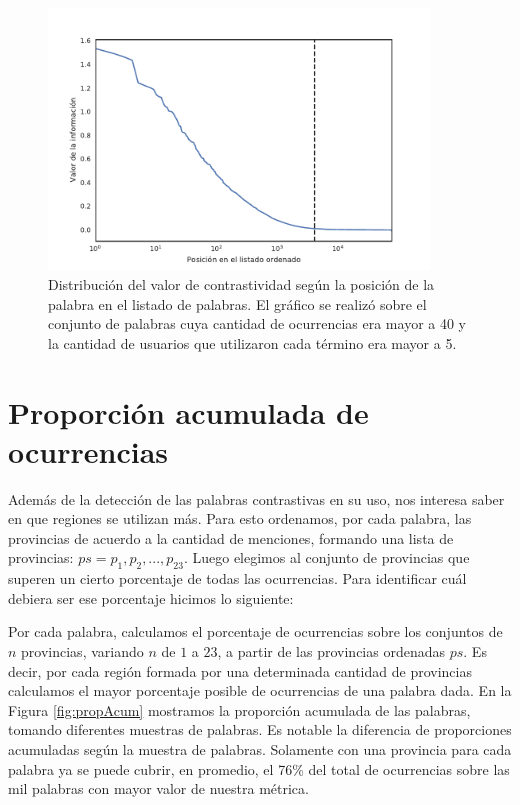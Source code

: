 \begin{figure}
\centering
\includegraphics[width=0.9\textwidth]{./images/train/conFiltro/valorInformacionCorte.pdf}
\caption{Distribución del valor de contrastividad según la posición de la palabra en el listado de palabras. El gráfico se realizó sobre el conjunto de palabras cuya cantidad de ocurrencias era mayor a 40 y la cantidad de usuarios que utilizaron cada término era mayor a 5. } 
\label{fig:ivalue}
\end{figure}


\section{Proporción acumulada de ocurrencias} %
\label{proporcionDeOcurrencias}
Además de la detección de las palabras contrastivas en su uso, nos interesa saber en que regiones se utilizan más. Para esto ordenamos, por cada palabra, las provincias de acuerdo a la cantidad de menciones, formando una lista de provincias: $ps = p_1,p_2,...,p_{23}$. Luego elegimos al conjunto de provincias que superen un cierto porcentaje de todas las ocurrencias. Para identificar cuál debiera ser ese porcentaje hicimos lo siguiente:

Por cada palabra, calculamos el porcentaje de ocurrencias sobre los conjuntos de $n$ provincias, variando $n$ de $1$ a $23$, a partir de las provincias ordenadas $ps$. Es decir, por cada región formada por una determinada cantidad de provincias calculamos el mayor porcentaje posible de ocurrencias de una palabra dada.
En la Figura \ref{fig:propAcum} mostramos la proporción acumulada de las palabras, tomando diferentes muestras de palabras. Es notable la diferencia de proporciones acumuladas según la muestra de palabras. Solamente con una provincia para cada palabra ya se puede cubrir, en promedio, el 76\% del total de ocurrencias sobre las mil palabras con mayor valor de nuestra métrica.


